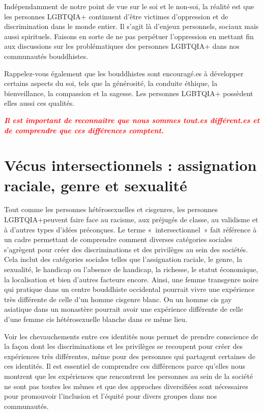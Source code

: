 \documentclass[12pt,openany]{book}
\renewenvironment{quote}{%
  \list{}{%
    \leftmargin-0.1cm   %
    \rightmargin\leftmargin
  }
  \item\relax
}
{\endlist}
\begin{document}
Indépendamment de notre point de vue sur le soi et le non-soi, la réalité est que les personnes \mbox{LGBTQIA+} continuent d’être victimes d’oppression et de discrimination dans le monde entier. Il s’agit là d’enjeux personnels, sociaux mais aussi spirituels. Faisons en sorte de ne pas perpétuer l’oppression en mettant fin aux discussions sur les problématiques des personnes \mbox{LGBTQIA+} dans nos communautés bouddhistes.

Rappelez-vous également que les bouddhistes sont encouragé.es à développer certains aspects du soi, tels que la générosité, la conduite éthique, la bienveillance, la compassion et la sagesse. Les personnes \mbox{LGBTQIA+} possèdent elles aussi ces qualités.

\bigskip

\begin{quote}
\centering
\doublespacing
\textit{\Large \textcolor{red}{\textbf{Il est important de reconnaître que nous sommes tout.es différent.es et de comprendre que ces différences comptent.}}}
\end{quote}

\newpage
{}
\section*{Vécus intersectionnels : \normalsize assignation raciale, genre et \mbox{sexualité}}

\noindent Tout comme les personnes hétérosexuelles et cisgenres, les personnes \mbox{LGBTQIA+}peuvent faire face au racisme, aux préjugés de classe, au validisme et à d’autres types d’idées préconçues. Le terme \mbox{« intersectionnel »} fait référence à un cadre permettant de comprendre comment diverses catégories sociales s’agrègent pour créer des discriminations et des privilèges au sein des sociétés. Cela inclut des catégories sociales telles que l’assignation raciale, le genre, la sexualité, le handicap ou l’absence de handicap, la richesse, le statut économique, la localisation et bien d’autres facteurs encore. Ainsi, une femme transgenre noire qui pratique dans un centre bouddhiste occidental pourrait vivre une expérience très différente de celle d’un homme cisgenre blanc. Ou un homme cis gay asiatique dans un monastère pourrait avoir une expérience différente de celle d’une femme cis hétérosexuelle blanche dans ce même lieu.

Voir les chevauchements entre ces identités nous permet de prendre conscience de la façon dont les discriminations et les privilèges se recoupent pour créer des expériences très différentes, même pour des personnes qui partagent certaines de ces identités. Il est essentiel de comprendre ces différences parce qu’elles nous montrent que les expériences que rencontrent les personnes au sein de la société ne sont pas toutes les mêmes et que des approches diversifiées sont nécessaires pour promouvoir l’inclusion et l’équité pour divers groupes dans nos communautés.
\end{document}
